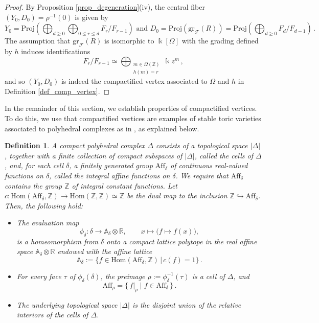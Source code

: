 \documentclass[12pt,letterpaper, reqno]{amsart}
\theoremstyle{defstyle} \newtheorem{definition}[theorem]{Definition}
\theoremstyle{remark}
\numberwithin{equation}{section}
\numberwithin{figure}{section}
\newcommand{\cF} {\mathcal{F}}
\newcommand{\Proj} {\mathrm{Proj}}
\newcommand{\gr} {\mathrm{gr}}
\newcommand{\kk} {\Bbbk}
\newcommand{\A} {\mathbb{A}}
\newcommand{\Hom} {\mathrm{Hom}}
\newcommand{\RR} {\mathbb{R}}
\newcommand{\ZZ} {\mathbb{Z}}
\begin{document}
\begin{proof}  
By Proposition \ref{prop_degeneration}(iv), the central fiber $(Y_0, D_0)=\rho^{-1}(0)$ is given by 
\[  Y_0 = \Proj \left( \bigoplus_{d \geq 0} \bigoplus_{0 \leq r \leq d} F_r/F_{r-1} \right) \text{    and    }D_0=\Proj(\gr_\cF(R))=\Proj \left( \bigoplus_{d \geq 0} F_d/F_{d-1} \right) \,.\]
The assumption that $\gr_\cF(R)$ is isomorphic to $\kk[\Omega]$ with the grading defined by $h$ induces identifications 
\[ F_r/F_{r-1} \simeq \bigoplus_{\substack{m \in \Omega(\ZZ)\\ h(m)=r}} \kk z^m \,,\]
and so $(Y_0, D_0)$ is indeed the compactified vertex associated to $\Omega$ and $h$ in Definition 
\ref{def_comp_vertex}. 
\end{proof}

In the remainder of this section, we establish properties of compactified vertices. 
To do this, we use that compactified vertices are examples of stable toric varieties associated to polyhedral complexes as in \cite{Valeryannals}, as explained below.

\begin{definition}
    A \emph{compact polyhedral complex} $\Delta$ consists of a topological space $|\Delta|$, together with a finite collection of compact subspaces of $|\Delta|$, called the \emph{cells} of $\Delta$, and, for each cell $\delta$, a finitely generated group $\mathrm{Aff}_\delta$ of continuous real-valued functions on $\delta$, called the \emph{integral affine functions} on $\delta$.
    We require that $\mathrm{Aff}_\delta$ contains the group $\ZZ$ of integral constant functions. 
    Let $c: \Hom(\mathrm{Aff}_\delta, \ZZ) \rightarrow \Hom(\ZZ,\ZZ) \simeq \ZZ$ be the dual map
    to the inclusion $\ZZ \hookrightarrow \mathrm{Aff}_\delta$. Then, the following hold:
    \begin{itemize}
        \item[(i)] The evaluation map
    \[
    \phi_\delta:\delta \longrightarrow \A_\delta \otimes \RR,
    \qquad
    x\longmapsto \bigl(f\mapsto f(x)\bigr),
    \]
    is a homeomorphism from $\delta$ onto a compact lattice polytope in the real affine space $\A_\delta \otimes \RR$ endowed with the affine lattice 
    \[ \A_\delta:=\{ f \in \Hom(\mathrm{Aff}_\delta, \ZZ)\,|\, c(f)=1\}\,. \]
    \item[(ii)] For every face $\tau$ of $\phi_\delta(\delta)$, the preimage
$\rho:=\phi_\delta^{-1}(\tau)$
    is a cell of $\Delta$, and
\[ \mathrm{Aff}_\rho=\{\,f|_\rho \mid f\in \mathrm{Aff}_\delta\,\}\,.\]
    \item[(iii)] The underlying topological space $|\Delta|$ is the disjoint union of the relative interiors of the cells of $\Delta$.
    \end{itemize}
\end{definition}
\end{document}
